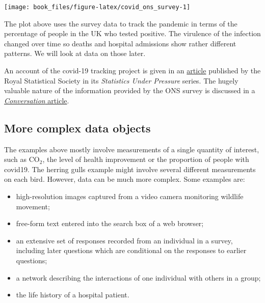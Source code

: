 \documentclass[
]{book}
\providecommand{\tightlist}{%
  \setlength{\itemsep}{0pt}\setlength{\parskip}{0pt}}
\begin{document}
\begin{center}\texttt{[image: book\_files/figure-latex/covid\_ons\_survey-1]} \end{center}

The plot above uses the survey data to track the pandemic in terms of the percentage of people in the UK who tested positive. The virulence of the infection changed over time so deaths and hospital admissions show rather different patterns. We will look at data on those later.

An account of the covid-19 tracking project is given in an \href{https://rss.org.uk/policy-campaigns/policy-groups/statistics-under-pressure-steering-group/statistics-under-pressure-informing-decision-makin/statistics-under-pressure-case-studies/how-do-we-know-how-many-people-have-covid-19-the-c/}{article} published by the Royal Statistical Society in its \emph{Statistics Under Pressure} series.
The hugely valuable nature of the information provided by the ONS survey is discussed in a \href{https://theconversation.com/the-ons-has-published-its-final-covid-infection-survey-heres-why-its-been-such-a-valuable-resource-202589?utm_medium=email&utm_campaign=Latest\%20from\%20The\%20Conversation\%20for\%20March\%2030\%202023\%20-\%202584725991&utm_content=Latest\%20from\%20The\%20Conversation\%20for\%20March\%2030\%202023\%20-\%202584725991+CID_f84345cb33348a28f83cffbda29f758a&utm_source=campaign_monitor_uk&utm_term=The\%20ONS\%20has\%20published\%20its\%20final\%20COVID\%20infection\%20survey\%20\%20heres\%20why\%20its\%20been\%20such\%20a\%20valuable\%20resource}{\emph{Conversation} article}.

\subsection{More complex data objects}\label{more-complex-data-objects}

The examples above mostly involve measurements of a single quantity of interest, such as CO\(_2\), the level of health improvement or the proportion of people with covid19. The herring gulls example might involve several different measurements on each bird. However, data can be much more complex. Some examples are:

\begin{itemize}
\tightlist
\item
  high-resolution images captured from a video camera monitoring wildlife movement;
\item
  free-form text entered into the search box of a web browser;
\item
  an extensive set of responses recorded from an individual in a survey, including later questions which are conditional on the responses to earlier questions;
\item
  a network describing the interactions of one individual with others in a group;
\item
  the life history of a hospital patient.
\end{itemize}
\end{document}
